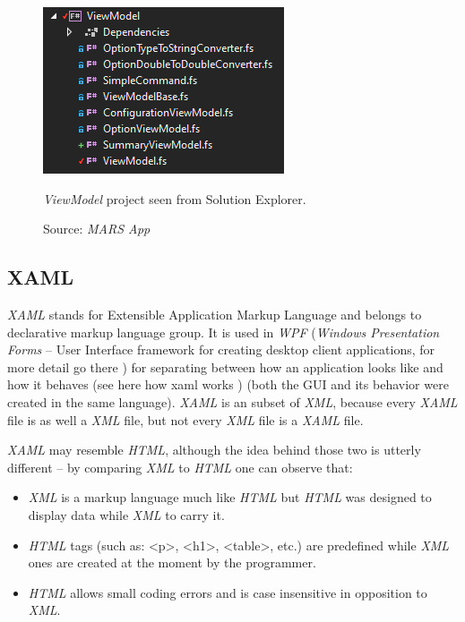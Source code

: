         \begin{figure}[H]
            \centering
            \includegraphics{img/viewmodel.png}
            \caption{\textit{ViewModel} project seen from Solution Explorer.}
            \caption*{Source: \textit{MARS App}}
            \label{fig:viewmodel}
        \end{figure} 
    
\subsection{XAML}
    \textit{XAML} stands for Extensible Application Markup Language and belongs to declarative markup language group. It is used in \textit{WPF} (\textit{Windows Presentation Forms} -- User Interface framework for creating desktop client applications, for more detail go there \cite{wpf}) for separating between how an application looks like and how it behaves (see here how xaml works \cite{how_xaml_works}) (both the GUI and its behavior were created in the same language). \textit{XAML} is an subset of \textit{XML}, because every \textit{XAML} file is as well a \textit{XML} file, but not every \textit{XML} file is a \textit{XAML} file.
    
    \textit{XAML} may resemble \textit{HTML}, although the idea behind those two is utterly different -- by comparing \textit{XML} to \textit{HTML} one can observe that:
    \begin{itemize}
        \item \textit{XML} is a markup language much like \textit{HTML} but \textit{HTML} was designed to display data while \textit{XML} to carry it.
        \item \textit{HTML} tags (such as: <p>, <h1>, <table>, etc.) are predefined while \textit{XML} ones are created at the moment by the programmer.
        \item \textit{HTML} allows small coding errors and is case insensitive in opposition to \textit{XML}.
    \end{itemize}
